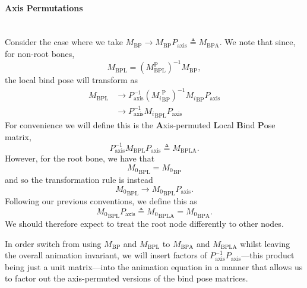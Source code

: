 \documentclass{article}
\begin{document}
\paragraph{Axis Permutations}\mbox{}\\
Consider the case where we take ${M}_\mathrm{BP} \to {M}_\mathrm{BP} P_\mathrm{axis} \triangleq {M}_\mathrm{BPA}$. We note that since, for non-root bones, 
\begin{equation}
{M}_\mathrm{BPL} = \left({M}_\mathrm{BPL}^\mathrm{P}\right)^{-1} {M}_\mathrm{BP},
\end{equation}
the local bind pose will transform as
\begin{align}
{M}_\mathrm{BPL}  &\to P_\mathrm{axis}^{-1} \left({M_i}_\mathrm{BP}^\mathrm{P}\right)^{-1} {M_i}_\mathrm{BP} P_\mathrm{axis} \\
&\to P_\mathrm{axis}^{-1}{M_i}_\mathrm{BPL} P_\mathrm{axis}
\end{align}
For convenience we will define this is the \textbf{A}xis-permuted \textbf{L}ocal \textbf{B}ind \textbf{P}ose matrix,
\begin{equation}
P_\mathrm{axis}^{-1}M_\mathrm{BPL} P_\mathrm{axis} \triangleq M_\mathrm{BPLA}.
\end{equation}
However, for the root bone, we have that
\begin{equation}
{M_0}_\mathrm{BPL} = {M_0}_\mathrm{BP}
\end{equation}
and so the transformation rule is instead
\begin{equation}
{M_0}_\mathrm{BPL} \to {M_0}_\mathrm{BPL} P_\mathrm{axis}.
\end{equation}
Following our previous conventions, we define this as
\begin{equation}
{M_0}_\mathrm{BPL} P_\mathrm{axis} \triangleq {M_0}_\mathrm{BPLA} = {M_0}_\mathrm{BPA}.
\end{equation}
We should therefore expect to treat the root node differently to other nodes.

In order switch from using $M_\mathrm{BP}$ and $M_\mathrm{BPL}$ to  $M_\mathrm{BPA}$ and $M_\mathrm{BPLA}$ whilst leaving the overall animation invariant, we will insert factors of $P_\mathrm{axis}^{-1}P_\mathrm{axis}$---this product being just a unit matrix---into the animation equation in a manner that allows us to factor out the axis-permuted versions of the bind pose matrices.
\end{document}
